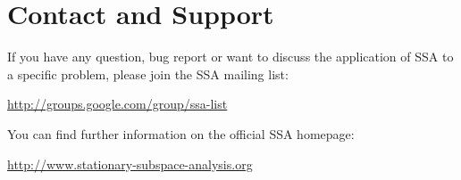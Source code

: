 \documentclass{article}
\newcommand{\1}{\ensuremath{\mathds{1}}}
\newcommand{\0}{\ensuremath{0}}
\begin{document}
\section{Contact and Support}

If you have any question, bug report or want to discuss the application of SSA
to a specific problem, please join the SSA mailing list:
\begin{center}
        \url{http://groups.google.com/group/ssa-list}
\end{center}
You can find further
information on the official SSA homepage: 
\begin{center}
	\url{http://www.stationary-subspace-analysis.org}
\end{center}




\end{document}
